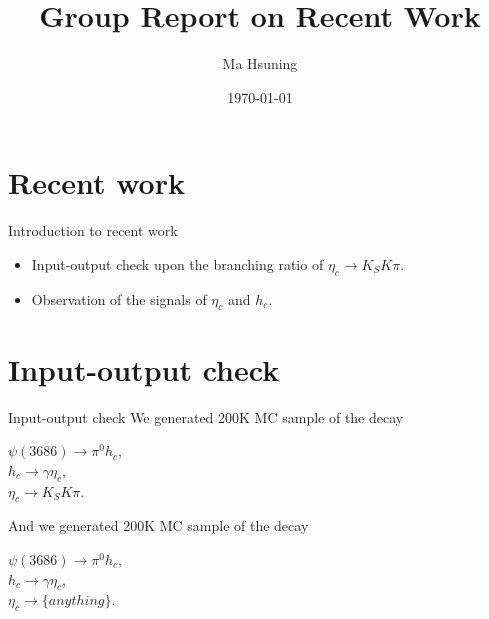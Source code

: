 \documentclass{beamer}
\title[Group Report]{Group Report on Recent Work}
\author{Ma Hsuning}
\institute[NKU]
{
    Physics of NKU\\
    \medskip
    \textit{maxn@ihep.ac.cn}
}
\date{\today}
\begin{document}
\frame{\titlepage}

\section{Recent work}
\begin{frame}{Introduction to recent work}
\begin{itemize}
\item Input-output check upon the branching ratio of ${\eta}_c \rightarrow K_S K \pi$.
\bigskip
\item Observation of the signals of ${\eta}_c$ and $h_c$.
\end{itemize}
\end{frame}

\section{Input-output check}
\begin{frame}{Input-output check}
We generated 200K MC sample of the decay\\
        \begin{center}
$\psi(3686)  \rightarrow {\pi}^0 h_c$,\\
        $h_c  \rightarrow \gamma {\eta}_c$,\\
        ${\eta}_c  \rightarrow K_S K \pi$.
        \end{center}
And we generated 200K MC sample of the decay\\
        \begin{center}
$\psi(3686)  \rightarrow {\pi}^0 h_c$,\\
        $h_c  \rightarrow \gamma {\eta}_c$,\\
        ${\eta}_c  \rightarrow \{anything\}$.
        \end{center}
\end{frame}
\end{document}
